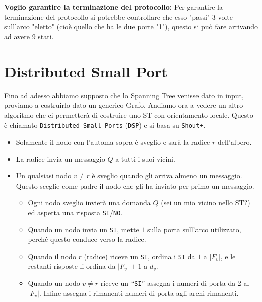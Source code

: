 \textbf{Voglio garantire la terminazione del protocollo: }
Per garantire la terminazione del protocollo si potrebbe controllare che esso
"passi" 3 volte sull'arco "eletto" (cioè quello che ha le due porte "1"), questo
si può fare arrivando ad avere 9 stati.

\section{Distributed Small Port}
Fino ad adesso abbiamo supposto che lo Spanning Tree venisse dato in input,
proviamo a costruirlo dato un generico Grafo. Andiamo ora a vedere un altro
algoritmo che ci permetterà di costruire uno ST con orientamento locale. Questo
è chiamato \texttt{Distributed Small Ports} (\texttt{DSP}) e si basa su
\texttt{Shout+}.
\begin{itemize}
    \item Solamente il nodo con l'automa sopra è sveglio e sarà la radice $r$
          dell'albero.
    \item La radice invia un messaggio $Q$ a tutti i suoi vicini.
    \item Un qualsiasi nodo $v \neq r$ è sveglio quando gli arriva almeno un
          messaggio. Questo sceglie come padre il nodo che gli ha inviato per
          primo un messaggio.
          \begin{itemize}
              \item Ogni nodo sveglio invierà una domanda $Q$ (sei un mio vicino
                    nello ST?) ed aspetta una risposta \texttt{SI}/\texttt{NO}.
              \item Quando un nodo invia un \texttt{SI}, mette $1$ sulla porta
                    sull'arco utilizzato, perché questo conduce verso la radice.
              \item Quando il nodo $r$ (radice) riceve un \texttt{SI}, ordina i
                    \texttt{SI} da $1$ a $|F_v|$, e le restanti risposte li
                    ordina da $|F_v|+1$ a $d_v$.
              \item Quando un nodo $v \neq r$ riceve un ``\texttt{SI}'' assegna
                    i numeri di porta da 2 al $|F_v|$. Infine assegna i
                    rimanenti numeri di porta agli archi rimanenti.
          \end{itemize}
\end{itemize}

